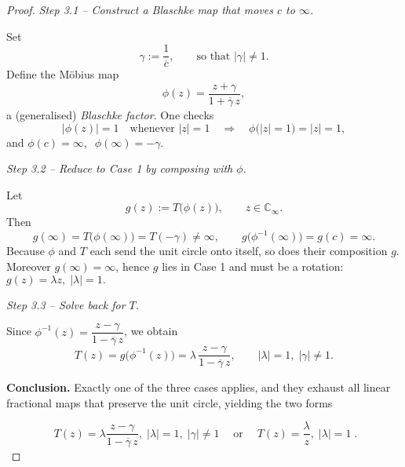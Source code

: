 \documentclass[12pt]{article}
\theoremstyle{definition} %
\theoremstyle{plain} %
\begin{document}
\begin{proof}
   \medskip
   \emph{Step 3.1 –   Construct a Blaschke map that moves $c$ to $\infty$.}
   
   Set
   \[
      \gamma:=\frac{1}{\overline{c}},\qquad\text{so that }|\gamma|\neq1.
   \]
   Define the Möbius map
   \[
      \phi(z)=\frac{z+\gamma}{1+\overline{\gamma}\,z},
   \]
   a (generalised) \emph{Blaschke factor}.  One checks
   \[
      |\phi(z)|=1\quad\text{whenever }|z|=1
      \quad\Longrightarrow\quad \phi\bigl(\lvert z\rvert=1\bigr)
      =\lvert z\rvert=1,
   \]
   and
   \(
      \phi(c)=\infty,\;\; \phi(\infty)= -\gamma.
   \)
   
   \medskip
   \emph{Step 3.2 –  Reduce to Case 1 by composing with $\phi$.}
   
   Let
   \[
      g(z):=T\!\bigl(\phi(z)\bigr),\qquad z\in\mathbb{{C}}_\infty.
   \]
   Then
   \[
      g(\infty)=T\!\bigl(\phi(\infty)\bigr)=T(-\gamma)\neq\infty,
      \qquad
      g\bigl(\phi^{-1}(\infty)\bigr)=g(c)=\infty.
   \]
   Because $\phi$ and $T$ each send the unit circle onto itself,
   so does their composition \(g\).
   Moreover $g(\infty)=\infty$, hence \(g\) lies in Case 1 and must be a
   rotation:
   \(
      g(z)=\lambda z,\;|\lambda|=1.
   \)
   
   \medskip
   \emph{Step 3.3 –  Solve back for $T$.}
   
   Since $\phi^{-1}(z)=\dfrac{z-\gamma}{1-\overline{\gamma}\,z}$,
   we obtain
   \[
      T(z)=g\!\bigl(\phi^{-1}(z)\bigr)
          =\lambda\,\frac{z-\gamma}{1-\overline{\gamma}\,z},
      \qquad |\lambda|=1,\;|\gamma|\neq1.
   \]
   
   \bigskip
   \noindent\textbf{Conclusion.}
   Exactly one of the three cases applies, and they exhaust all linear
   fractional maps that preserve the unit circle, yielding the two forms
   
   \[
      \boxed{\;
         T(z)=\lambda \frac{z-\gamma}{1-\overline{\gamma}\,z},
         \;|\lambda|=1,\;|\gamma|\neq1
      \;}
      \quad\text{or}\quad
      \boxed{\;
         T(z)=\frac{\lambda}{z},
         \;|\lambda|=1
      \;}.
   \]
   \end{proof}
\end{document}

